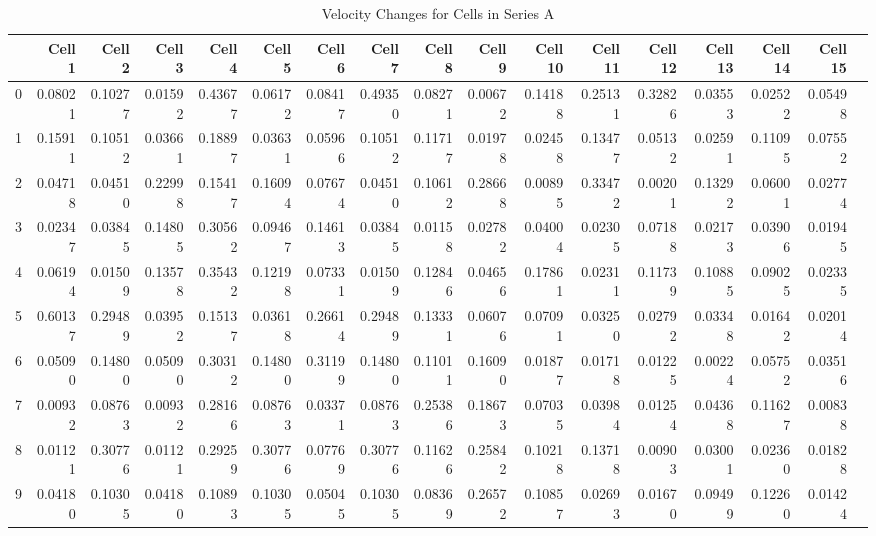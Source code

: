 \documentclass{article}
\begin{document}
\begin{landscape} %
\begin{table}[htbp]
\centering
\caption{Velocity Changes for Cells in Series A }
\label{tab:velocity_changes}
\begin{tabular}{lrrrrrrrrrrrrrrrr}
\toprule
 & \textbf{Cell 1} & \textbf{Cell 2} & \textbf{Cell 3} & \textbf{Cell 4} & \textbf{Cell 5} & \textbf{Cell 6} & \textbf{Cell 7} & \textbf{Cell 8} & \textbf{Cell 9} & \textbf{Cell 10} & \textbf{Cell 11} & \textbf{Cell 12} & \textbf{Cell 13} & \textbf{Cell 14} & \textbf{Cell 15} \\
\midrule
0 & 0.08021 & 0.10277 & 0.01592 & 0.43677 & 0.06172 & 0.08417 & 0.49350 & 0.08271 & 0.00672 & 0.14188 & 0.25131 & 0.32826 & 0.03553 & 0.02522 & 0.05498 \\
1 & 0.15911 & 0.10512 & 0.03661 & 0.18897 & 0.03631 & 0.05966 & 0.10512 & 0.11717 & 0.01978 & 0.02458 & 0.13477 & 0.05132 & 0.02591 & 0.11095 & 0.07552 \\
2 & 0.04718 & 0.04510 & 0.22998 & 0.15417 & 0.16094 & 0.07674 & 0.04510 & 0.10612 & 0.28668 & 0.00895 & 0.33472 & 0.00201 & 0.13292 & 0.06001 & 0.02774 \\
3 & 0.02347 & 0.03845 & 0.14805 & 0.30562 & 0.09467 & 0.14613 & 0.03845 & 0.01158 & 0.02782 & 0.04004 & 0.02305 & 0.07188 & 0.02173 & 0.03906 & 0.01945 \\
4 & 0.06194 & 0.01509 & 0.13578 & 0.35432 & 0.12198 & 0.07331 & 0.01509 & 0.12846 & 0.04656 & 0.17861 & 0.02311 & 0.11739 & 0.10885 & 0.09025 & 0.02335 \\
5 & 0.60137 & 0.29489 & 0.03952 & 0.15137 & 0.03618 & 0.26614 & 0.29489 & 0.13331 & 0.06076 & 0.07091 & 0.03250 & 0.02792 & 0.03348 & 0.01642 & 0.02014 \\
6 & 0.05090 & 0.14800 & 0.05090 & 0.30312 & 0.14800 & 0.31199 & 0.14800 & 0.11011 & 0.16090 & 0.01877 & 0.01718 & 0.01225 & 0.00224 & 0.05752 & 0.03516 \\
7 & 0.00932 & 0.08763 & 0.00932 & 0.28166 & 0.08763 & 0.03371 & 0.08763 & 0.25386 & 0.18673 & 0.07035 & 0.03984 & 0.01254 & 0.04368 & 0.11627 & 0.00838 \\
8 & 0.01121 & 0.30776 & 0.01121 & 0.29259 & 0.30776 & 0.07769 & 0.30776 & 0.11626 & 0.25842 & 0.10218 & 0.13718 & 0.00903 & 0.03001 & 0.02360 & 0.01828 \\
9 & 0.04180 & 0.10305 & 0.04180 & 0.10893 & 0.10305 & 0.05045 & 0.10305 & 0.08369 & 0.26572 & 0.10857 & 0.02693 & 0.01670 & 0.09499 & 0.12260 & 0.01424 \\

\end{tabular}
\end{table}
\end{landscape}
\end{document}
